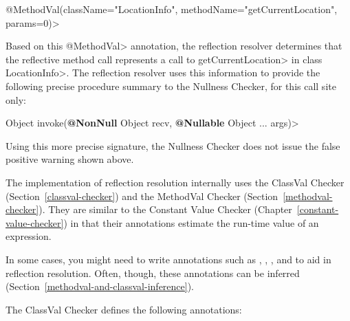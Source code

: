 \quad \<@MethodVal(className="LocationInfo", methodName="getCurrentLocation", params=0)>

Based on this \<@MethodVal> annotation, the reflection resolver determines that
the reflective method call represents a call to \<getCurrentLocation> in class
\<LocationInfo>.
The reflection resolver uses this information to provide the
following precise procedure summary to the Nullness Checker, for this
call site only:

\quad {} Object invoke({\bfseries @NonNull} Object recv, {\bfseries @Nullable} Object ... args)>

Using this more precise signature, the Nullness Checker does not issue the false positive warning shown above.



The implementation of reflection resolution internally uses the ClassVal
Checker (Section~\ref{classval-checker}) and the MethodVal Checker
(Section~\ref{methodval-checker}).  They are similar to the Constant
Value Checker (Chapter~\ref{constant-value-checker}) in that their
annotations estimate the run-time value of an expression.

In some cases, you might need to write annotations such as
,
,
, and
 to aid in reflection
resolution.
Often, though, these annotations can be inferred
(Section~\ref{methodval-and-classval-inference}).



The ClassVal Checker defines the following annotations:

